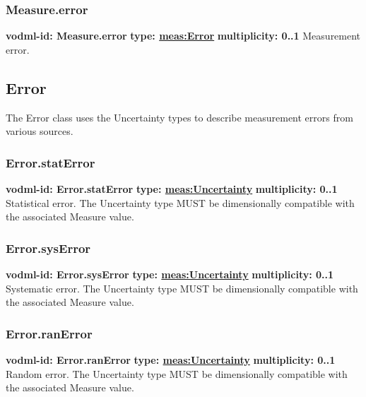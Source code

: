     \subsubsection{Measure.error}
      \textbf{vodml-id: Measure.error} \newline
      \textbf{type: \hyperref[sect:Error]{meas:Error}} \newline
      \textbf{multiplicity: 0..1} \newline 
      Measurement error.

  \subsection{Error}
  \label{sect:Error}
    The Error class uses the Uncertainty types to describe measurement errors from various sources.

    \subsubsection{Error.statError}
      \textbf{vodml-id: Error.statError} \newline
      \textbf{type: \hyperref[sect:Uncertainty]{meas:Uncertainty}} \newline
      \textbf{multiplicity: 0..1} \newline 
      Statistical error. The Uncertainty type MUST be dimensionally compatible with the associated Measure value.

    \subsubsection{Error.sysError}
      \textbf{vodml-id: Error.sysError} \newline
      \textbf{type: \hyperref[sect:Uncertainty]{meas:Uncertainty}} \newline
      \textbf{multiplicity: 0..1} \newline 
      Systematic error. The Uncertainty type MUST be dimensionally compatible with the associated Measure value.

    \subsubsection{Error.ranError}
      \textbf{vodml-id: Error.ranError} \newline
      \textbf{type: \hyperref[sect:Uncertainty]{meas:Uncertainty}} \newline
      \textbf{multiplicity: 0..1} \newline 
      Random error. The Uncertainty type MUST be dimensionally compatible with the associated Measure value.


